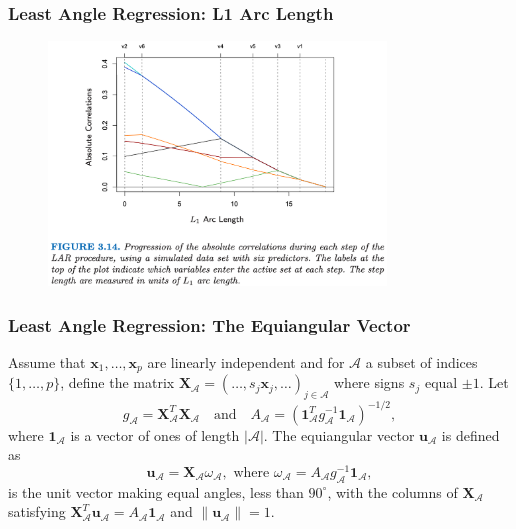 \begin{frame}
    \frametitle{Least Angle Regression: L1 Arc Length}
\begin{figure}[!htbp]
    \begin{center}
        \includegraphics[width=0.8\textwidth]{img/L1ArcLength.png}
    \end{center}
\end{figure}
\end{frame}

\begin{frame}
\frametitle{Least Angle Regression: The Equiangular Vector}
Assume that $\mathbf{x}_1,\dots,\mathbf{x}_p$ are linearly independent and for $\mathcal{A}$ a subset of indices $\{1,\dots,p\}$, define the matrix $\mathbf{X}_\mathcal{A}={(\dots,s_j\mathbf{x}_j,\dots)}_{j\in\mathcal{A}}$ where signs $s_j$ equal $\pm 1$. Let
\begin{equation}
    g_\mathcal{A}=\mathbf{X}_\mathcal{A}^T\mathbf{X}_\mathcal{A}
    \quad \text{and} \quad
    A_\mathcal{A}={(\mathbf{1}^T_\mathcal{A}g^{-1}_\mathcal{A}\mathbf{1}_\mathcal{A})}^{-1/2},\label{eq:lars25}
\end{equation}
where $\mathbf{1}_\mathcal{A}$ is a vector of ones of length $|\mathcal{A}|$. The equiangular vector $\mathbf{u}_\mathcal{A}$ is defined as
\begin{equation}
    \mathbf{u}_\mathcal{A}=\mathbf{X}_\mathcal{A}\omega_\mathcal{A}, \text{ where } \omega_\mathcal{A}=A_\mathcal{A} g^{-1}_\mathcal{A}\mathbf{1}_\mathcal{A},\label{eq:lars26}
\end{equation}
is the unit vector making equal angles, less than $90^\circ$, with the columns of $\mathbf{X}_\mathcal{A}$ satisfying $\mathbf{X}_\mathcal{A}^T\mathbf{u}_\mathcal{A}=A_\mathcal{A}\mathbf{1}_\mathcal{A}$ and $\|\mathbf{u}_\mathcal{A}\|=1$.
\end{frame}

